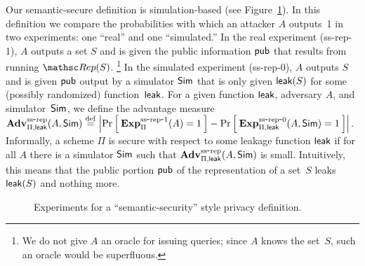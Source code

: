 


Our semantic-secure definition is simulation-based (see Figure~\ref{fig:privacy-ss}).
In this definition we compare the probabilities with which an attacker $A$ outputs~1
in two experiments: one ``real'' and one ``simulated.''
In the real experiment (ss-rep-1), $A$ outputs a set $S$  and is given the
public information ${\sf pub}$ that results from running $\Rep(S)$.
\footnote{We do not give $A$ an oracle for issuing queries;
since $A$ knows the set~$S$, such an oracle would be superfluous.
}
In the simulated experiment (ss-rep-0), $A$ outputs $S$ and is given ${\sf pub}$ output
by a simulator ${\sf Sim}$ that is only given ${\sf leak}(S)$ for some (possibly randomized)
function~${\sf leak}$.
For a given function ${\sf leak}$, adversary $A$, and simulator~${\sf Sim}$,
we define the advantage measure
$\mathrm{\mathbf{Adv}}^{\mathrm{ss\mbox{-}rep}}_{\Pi,{\sf leak}}(A,{\sf Sim}) \stackrel{\rm def}{=}
\left| \Pr\left[\: \mathrm{\mathbf{Exp}}^{\mathrm{ss\mbox{-}rep\mbox{-}1}}_{\Pi}(A)=1 \:\right] -
\Pr\left[\: \mathrm{\mathbf{Exp}}^{\mathrm{ss\mbox{-}rep\mbox{-}0}}_{\Pi,{\sf leak}}(A, {\sf Sim})=1 \:\right] \right|$.
Informally, a scheme $\Pi$ is secure with respect to some leakage function ${\sf leak}$
if for all $A$ there is a simulator ${\sf Sim}$ such that
$\mathrm{\mathbf{Adv}}^{\mathrm{ss\mbox{-}rep}}_{\Pi,{\sf leak}}(A,{\sf Sim})$ is small.
Intuitively, this means that the public portion
${\sf pub}$ of the representation of a set~$S$ leaks~${\sf leak}(S)$ and nothing more.
\begin{figure}[hbtp]
\centering
{}
\caption{Experiments for a ``semantic-security'' style privacy
  definition.}
\label{fig:privacy-ss}
\end{figure}

